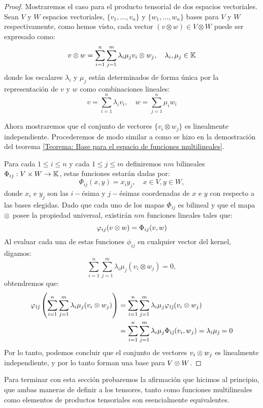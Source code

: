 \begin{proof}
	Mostraremos el caso para el producto tensorial de dos espacios vectoriales.
	Sean $V$ y $W$ espacios vectoriales, $\{v_1,\ldots,v_n\}$ y $\{w_1,\ldots,
		w_n\}$ bases para $V$ y $W$ respectivamente, como hemos visto, cada vector
	$(v \otimes w) \in V \otimes W$ puede ser expresado como:
	\[
		v \otimes w = \sum_{i=1}^{n}\sum_{j=1}^{m} \lambda_i \mu_j v_i \otimes w_j,
		\quad \lambda_i, \mu_j \in \mathbb{K}
	\]
	donde los escalares $\lambda_i$ y $\mu_j$ están determinados de forma única
	por la representación de $v$ y $w$ como combinaciones lineales:
	\[
		v = \sum_{i=1}^{n} \lambda_i v_i, \quad w = \sum_{j=1}^{n} \mu_i w_i
	\]

	Ahora mostraremos que el conjunto de vectores $\{v_i \otimes w_j\}$ es
	linealmente independiente. Procederemos de modo similar a como se hizo en la
	demostración del teorema \ref{Teorema: Base para el espacio de funciones
		multilineales}.

	Para cada $1 \leq i \leq n$ y cada $1 \leq j \leq m$ definiremos $n m$
	bilineales $\Phi_{i j}: V \times W \to \mathbb{K}$, estas funciones estarán dadas por:
	\[
		\Phi_{ij}(x,y) = x_i y_j, \quad x \in V, y \in W,
	\]
	donde $x_i$ e $y_j$ son las $i-$ésima y $j-$ésimas coordenadas de $x$ e $y$
	con respecto a las bases elegidas. Dado que cada uno de los mapas $\Phi_{ij}$ es
	bilineal y que el mapa $\otimes$ posee la propiedad universal, existirán $nm$
	funciones lineales tales que:
	\[
		\varphi_{ij}(v \otimes w) = \Phi_{ij}(v,w)
	\]
	Al evaluar cada una de estas funciones $\phi_{ij}$ en cualquier vector del
	kernel, digamos:
	\[
		\sum_{i=1}^{n}\sum_{j=1}^{m} \lambda_i \mu_j (v_i \otimes w_j) = 0,
	\]
	obtendremos que:
	\begin{align*}
		\varphi_{\hat{\imath}\hat{\jmath}}\left(\sum_{i=1}^{n}\sum_{j=1}^{m}\lambda_i\mu_j(v_i \otimes w_j)\right)
		 & = \sum_{i=1}^{n}\sum_{j=1}^{m}\lambda_i\mu_j\varphi_{\hat{\imath}\hat{\jmath}}(v_i\otimes w_j) \\
		 & = \sum_{i=1}^{n}\sum_{j=1}^{m}\lambda_i\mu_j\Phi_{\hat{\imath}\hat{\jmath}}(v_i,w_j)
		= \lambda_{\hat{\imath}} \mu_{\hat{\jmath}} = 0
	\end{align*}
	Por lo tanto, podemos concluir que el conjunto de vectores $v_i \otimes w_j$ es
	linealmente independiente, y por lo tanto forman una base para $V \otimes W$.
\end{proof}

Para terminar con esta sección probaremos la afirmación que hicimos al
principio, que ambas maneras de definir a los tensores, tanto como funciones
multilineales como elementos de productos tensoriales son esencialmente
equivalentes.

